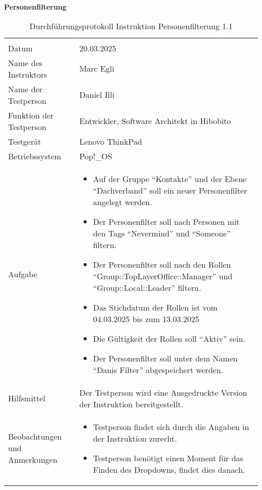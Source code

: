 \textbf{Personenfilterung}
\begin{table}[h!]
   \begin{tabular}{|L{0.4\textwidth}|L{0.6\textwidth}|}
       \hline
        \\
       Datum & 20.03.2025 \\
       \hline
       Name des Instruktors & Marc Egli \\
       \hline
       Name der Testperson & Daniel Illi \\
       \hline
       Funktion der Testperson & Entwickler, Software Architekt in Hibobito \\
       \hline
       Testgerät & Lenovo ThinkPad \\
       \hline
       Betriebssystem & Pop!\_OS \\
       \hline
       Aufgabe & 
       \begin{itemize}
         \item Auf der Gruppe ``Kontakte'' und der Ebene ``Dachverband'' soll ein neuer Personenfilter angelegt werden.
         \item Der Personenfilter soll nach Personen mit den Tags ``Nevermind'' und ``Someone'' filtern.
         \item Der Personenfilter soll nach den Rollen ``Group::TopLayerOffice::Manager'' und ``Group::Local::Leader'' filtern.
         \item Das Stichdatum der Rollen ist vom 04.03.2025 bis zum 13.03.2025
         \item Die Gültigkeit der Rollen soll ``Aktiv'' sein.
         \item Der Personenfilter soll unter dem Namen ``Danis Filter'' abgespeichert werden.
       \end{itemize} \\
       \hline
       Hilfsmittel & Der Testperson wird eine Ausgedruckte Version der Instruktion bereitgestellt. \\
       \hline
       Beobachtungen und Anmerkungen & 
       \begin{itemize}
         \item Testperson findet sich durch die Angaben in der Instruktion zurecht.
         \item Testperson benötigt einen Moment für das Finden des Dropdowns, findet dies danach.
       \end{itemize}   \\
       \hline
     \end{tabular}
     \caption{Durchführungsprotokoll Instruktion Personenfilterung 1.1}
\end{table}

